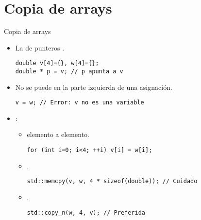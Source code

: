 \section{Copia de arrays}

\begin{frame}[t,fragile]{Copia de arrays}
\begin{itemize}
  \item La  de punteros .
\begin{lstlisting}
double v[4]={}, w[4]={};
double * p = v; // p apunta a v
\end{lstlisting}

  \item No se puede  
        en la parte izquierda de una asignación.
\begin{lstlisting}
v = w; // Error: v no es una variable
\end{lstlisting}

  \item {}:
    \begin{itemize}
      \item {} elemento a elemento.
\begin{lstlisting}
for (int i=0; i<4; ++i) v[i] = w[i];
\end{lstlisting}
      \item {}.
\begin{lstlisting}
std::memcpy(v, w, 4 * sizeof(double)); // Cuidado
\end{lstlisting}
      \item {}.
\begin{lstlisting}
std::copy_n(w, 4, v); // Preferida
\end{lstlisting}
    \end{itemize}
\end{itemize}
\end{frame}

